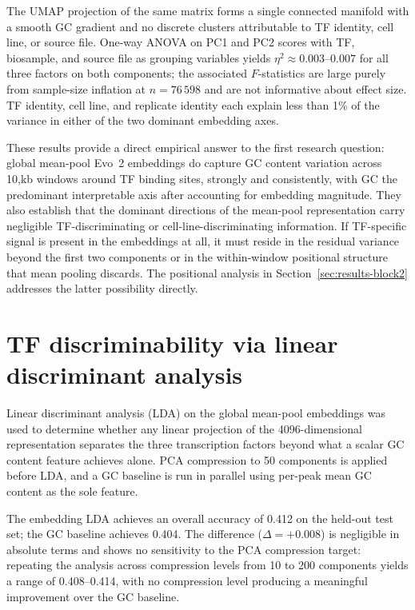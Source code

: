 \documentclass[12pt,a4paper,twoside,final]{book}
\begin{document}
The UMAP projection of the same matrix forms a single connected manifold with a smooth GC gradient and no discrete clusters attributable to TF identity, cell line, or source file.
One-way ANOVA on PC1 and PC2 scores with TF, biosample, and source file as grouping variables yields $\eta^2 \approx 0.003$--$0.007$ for all three factors on both components;
the associated $F$-statistics are large purely from sample-size inflation at $n = 76\,598$ and are not informative about effect size.
TF identity, cell line, and replicate identity each explain less than 1\% of the variance in either of the two dominant embedding axes.

These results provide a direct empirical answer to the first research question: global mean-pool Evo~2 embeddings do capture GC content variation across 10,kb windows around TF binding sites, strongly and consistently, with GC the predominant interpretable axis after accounting for embedding magnitude. %
They also establish that the dominant directions of the mean-pool representation carry negligible TF-discriminating or cell-line-discriminating information.
If TF-specific signal is present in the embeddings at all, it must reside in the residual variance beyond the first two components or in the within-window positional structure that mean pooling discards.
The positional analysis in Section~\ref{sec:results-block2} addresses the latter possibility directly.

\section{TF discriminability via linear discriminant analysis} %
\label{sec:results-block3}

Linear discriminant analysis (LDA) on the global mean-pool embeddings was used to determine whether any linear projection of the 4096-dimensional representation separates the three transcription factors beyond what a scalar GC content feature achieves alone. %
PCA compression to 50 components is applied before LDA, and a GC baseline is run in parallel using per-peak mean GC content as the sole feature.

The embedding LDA achieves an overall accuracy of 0.412 on the held-out test set;
the GC baseline achieves 0.404. %
The difference ($\Delta = +0.008$) is negligible in absolute terms and shows no sensitivity to the PCA compression target: repeating the analysis across compression levels from 10 to 200 components yields a range of 0.408--0.414, with no compression level producing a meaningful improvement over the GC baseline.
\end{document}
